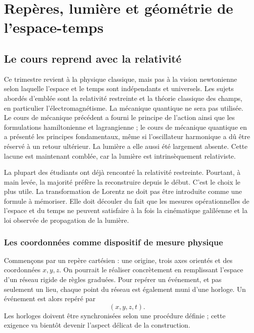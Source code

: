 \chapter{Repères, lumière et géométrie de l’espace-temps}

\section{Le cours reprend avec la relativité}

Ce trimestre revient à la physique classique, mais pas à la vision newtonienne selon laquelle l’espace et le temps sont indépendants et universels. Les sujets abordés d’emblée sont la relativité restreinte et la théorie classique des champs, en particulier l’électromagnétisme. La mécanique quantique ne sera pas utilisée. Le cours de mécanique précédent a fourni le principe de l’action ainsi que les formulations hamiltonienne et lagrangienne ; le cours de mécanique quantique en a présenté les principes fondamentaux, même si l’oscillateur harmonique a dû être réservé à un retour ultérieur. La lumière a elle aussi été largement absente. Cette lacune est maintenant comblée, car la lumière est intrinsèquement relativiste.

La plupart des étudiants ont déjà rencontré la relativité restreinte. Pourtant, à main levée, la majorité préfère la reconstruire depuis le début. C’est le choix le plus utile. La transformation de Lorentz ne doit pas être introduite comme une formule à mémoriser. Elle doit découler du fait que les mesures opérationnelles de l’espace et du temps ne peuvent satisfaire à la fois la cinématique galiléenne et la loi observée de propagation de la lumière.

\subsection{Les coordonnées comme dispositif de mesure physique}

Commençons par un repère cartésien : une origine, trois axes orientés et des coordonnées \(x,y,z\). On pourrait le réaliser concrètement en remplissant l’espace d’un réseau rigide de règles graduées. Pour repérer un événement, et pas seulement un lieu, chaque point du réseau est également muni d’une horloge. Un événement est alors repéré par
\begin{equation}
(x,y,z,t).
\end{equation}
Les horloges doivent être synchronisées selon une procédure définie ; cette exigence va bientôt devenir l’aspect délicat de la construction.

